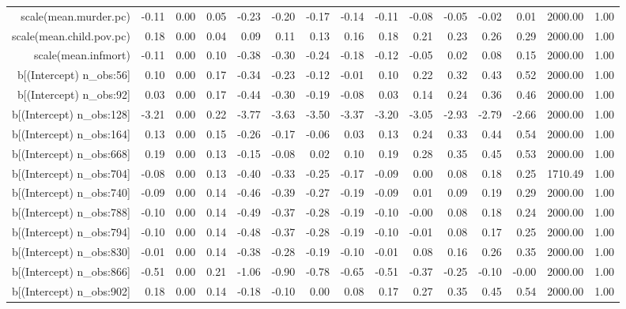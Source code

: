 \begin{table}[ht]
\begin{tabular}{rrrrrrrrrrrrrrr}
  scale(mean.murder.pc) & -0.11 & 0.00 & 0.05 & -0.23 & -0.20 & -0.17 & -0.14 & -0.11 & -0.08 & -0.05 & -0.02 & 0.01 & 2000.00 & 1.00 \\ 
  scale(mean.child.pov.pc) & 0.18 & 0.00 & 0.04 & 0.09 & 0.11 & 0.13 & 0.16 & 0.18 & 0.21 & 0.23 & 0.26 & 0.29 & 2000.00 & 1.00 \\ 
  scale(mean.infmort) & -0.11 & 0.00 & 0.10 & -0.38 & -0.30 & -0.24 & -0.18 & -0.12 & -0.05 & 0.02 & 0.08 & 0.15 & 2000.00 & 1.00 \\ 
  b[(Intercept) n\_obs:56] & 0.10 & 0.00 & 0.17 & -0.34 & -0.23 & -0.12 & -0.01 & 0.10 & 0.22 & 0.32 & 0.43 & 0.52 & 2000.00 & 1.00 \\ 
  b[(Intercept) n\_obs:92] & 0.03 & 0.00 & 0.17 & -0.44 & -0.30 & -0.19 & -0.08 & 0.03 & 0.14 & 0.24 & 0.36 & 0.46 & 2000.00 & 1.00 \\ 
  b[(Intercept) n\_obs:128] & -3.21 & 0.00 & 0.22 & -3.77 & -3.63 & -3.50 & -3.37 & -3.20 & -3.05 & -2.93 & -2.79 & -2.66 & 2000.00 & 1.00 \\ 
  b[(Intercept) n\_obs:164] & 0.13 & 0.00 & 0.15 & -0.26 & -0.17 & -0.06 & 0.03 & 0.13 & 0.24 & 0.33 & 0.44 & 0.54 & 2000.00 & 1.00 \\ 
  b[(Intercept) n\_obs:668] & 0.19 & 0.00 & 0.13 & -0.15 & -0.08 & 0.02 & 0.10 & 0.19 & 0.28 & 0.35 & 0.45 & 0.53 & 2000.00 & 1.00 \\ 
  b[(Intercept) n\_obs:704] & -0.08 & 0.00 & 0.13 & -0.40 & -0.33 & -0.25 & -0.17 & -0.09 & 0.00 & 0.08 & 0.18 & 0.25 & 1710.49 & 1.00 \\ 
  b[(Intercept) n\_obs:740] & -0.09 & 0.00 & 0.14 & -0.46 & -0.39 & -0.27 & -0.19 & -0.09 & 0.01 & 0.09 & 0.19 & 0.29 & 2000.00 & 1.00 \\ 
  b[(Intercept) n\_obs:788] & -0.10 & 0.00 & 0.14 & -0.49 & -0.37 & -0.28 & -0.19 & -0.10 & -0.00 & 0.08 & 0.18 & 0.24 & 2000.00 & 1.00 \\ 
  b[(Intercept) n\_obs:794] & -0.10 & 0.00 & 0.14 & -0.48 & -0.37 & -0.28 & -0.19 & -0.10 & -0.01 & 0.08 & 0.17 & 0.25 & 2000.00 & 1.00 \\ 
  b[(Intercept) n\_obs:830] & -0.01 & 0.00 & 0.14 & -0.38 & -0.28 & -0.19 & -0.10 & -0.01 & 0.08 & 0.16 & 0.26 & 0.35 & 2000.00 & 1.00 \\ 
  b[(Intercept) n\_obs:866] & -0.51 & 0.00 & 0.21 & -1.06 & -0.90 & -0.78 & -0.65 & -0.51 & -0.37 & -0.25 & -0.10 & -0.00 & 2000.00 & 1.00 \\ 
  b[(Intercept) n\_obs:902] & 0.18 & 0.00 & 0.14 & -0.18 & -0.10 & 0.00 & 0.08 & 0.17 & 0.27 & 0.35 & 0.45 & 0.54 & 2000.00 & 1.00 \\ 

\end{tabular}
\end{table}
